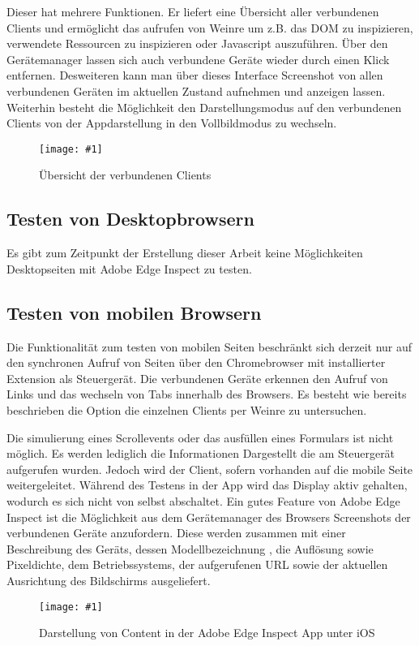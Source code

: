 \documentclass[13pt,a4paper,oneside]{scrbook} %
\newcommand{\mi}[1]{\index{#1}#1}
\renewcommand{\\}{\bigskip}
\newcommand{\iga}[3]{
\begin{figure}[H]
	\centering
	\texttt{[image: \#1]}%
	\caption[#2]{#3}%
\end{figure}
}
\newcommand{\igp}[5]{
\begin{figure}[H]
	\centering
	\texttt{[image: \#1]}%
	\caption[#2]{#3}%
\end{figure}
}
\begin{document}
		\\Dieser hat mehrere Funktionen. Er liefert eine Übersicht aller verbundenen Clients und ermöglicht das aufrufen von 			\mi{Weinre} um z.B. das DOM zu inspizieren, verwendete Ressourcen zu inspizieren oder Javascript auszuführen. Über 			den Gerätemanager lassen sich auch verbundene Geräte wieder durch einen Klick entfernen. Desweiteren kann man über 		dieses Interface Screenshot von allen verbundenen Geräten im aktuellen Zustand aufnehmen und anzeigen lassen. 			Weiterhin besteht die Möglichkeit den Darstellungsmodus auf den verbundenen Clients von der Appdarstellung in den 			Vollbildmodus zu wechseln.
		\iga{../pictures/adobeedgeinspect/desktop_3}{Adobe Edge Inspect Gerätemanager}{Übersicht der verbundenen Clients}
		
		\subsection{Testen von Desktopbrowsern}
		Es gibt zum Zeitpunkt der Erstellung dieser Arbeit keine Möglichkeiten Desktopseiten mit Adobe Edge Inspect zu testen.
		
		\subsection{Testen von mobilen Browsern}
		Die Funktionalität zum testen von mobilen Seiten beschränkt sich derzeit nur auf den synchronen Aufruf von Seiten über 			den Chromebrowser mit installierter Extension als Steuergerät. Die verbundenen Geräte erkennen den Aufruf von Links 			und das wechseln von Tabs innerhalb des Browsers. Es besteht wie bereits beschrieben die Option die einzelnen Clients 			per \mi{Weinre} zu untersuchen.
		
		\\Die simulierung eines Scrollevents oder das ausfüllen eines Formulars ist nicht möglich. Es werden lediglich die 				Informationen Dargestellt die am Steuergerät aufgerufen wurden. Jedoch wird der Client, sofern vorhanden auf die mobile 		Seite weitergeleitet. Während des Testens in der App wird das Display aktiv gehalten, wodurch es sich nicht von selbst 			abschaltet. Ein gutes Feature von Adobe Edge Inspect ist die Möglichkeit aus dem Gerätemanager des Browsers 				Screenshots der verbundenen Geräte anzufordern. Diese werden zusammen mit einer Beschreibung des Geräts, dessen 		Modellbezeichnung , die Auflösung sowie Pixeldichte, dem Betriebssystems, der aufgerufenen URL sowie der aktuellen 			Ausrichtung des Bildschirms ausgeliefert.
		\igp{../pictures/adobeedgeinspect/iphone_3}{Adobe Edge Inspect App Content Darstellung}{Darstellung von Content in der 		Adobe Edge Inspect App unter iOS}{200}{350}
		
\end{document}
